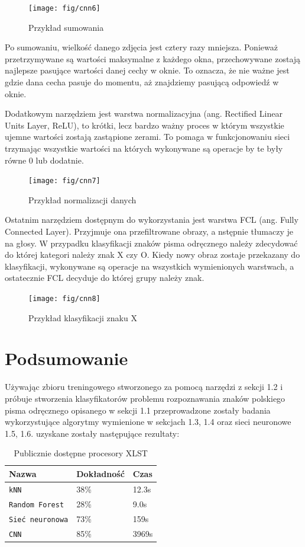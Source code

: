 \documentclass[brudnopis]{xmgr}
\begin{document}
\begin{figure}[!tbh]
\centering
\texttt{[image: fig/cnn6]}
\caption{Przykład sumowania}
\end{figure}

Po sumowaniu, wielkość danego zdjęcia jest cztery razy mniejsza. Ponieważ przetrzymywane są wartości maksymalne z każdego okna, przechowywane zostają najlepsze pasujące wartości danej cechy w oknie. To oznacza, że nie ważne jest gdzie dana cecha pasuje do momentu, aż znajdziemy pasującą odpowiedź w oknie.

Dodatkowym narzędziem jest warstwa normalizacyjna (ang. Rectified Linear Units Layer, ReLU), to krótki, lecz bardzo ważny proces w którym wszystkie ujemne wartości zostają zastąpione zerami. To pomaga w funkcjonowaniu sieci trzymając wszystkie wartości na których wykonywane są operacje by te były równe 0 lub dodatnie.

\begin{figure}[!tbh]
\centering
\texttt{[image: fig/cnn7]}
\caption{Przykład normalizacji danych}
\end{figure}
\newpage

Ostatnim narzędziem dostępnym do wykorzystania jest warstwa FCL (ang. Fully Connected Layer). Przyjmuje ona przefiltrowane obrazy, a nstępnie tłumaczy je na głosy. W przypadku klasyfikacji znaków pisma odręcznego należy zdecydować do której kategori należy znak X czy O. Kiedy nowy obraz zostaje przekazany do klasyfikacji, wykonywane są operacje na wszystkich wymienionych warstwach, a ostatecznie FCL decyduje do której grupy należy znak.

\begin{figure}[!tbh]
\centering
\texttt{[image: fig/cnn8]}
\caption{Przykład klasyfikacji znaku X}
\end{figure}
\newpage

\section{Podsumowanie}

Używając zbioru treningowego stworzonego za pomocą narzędzi z sekcji 1.2 i próbuje stworzenia klasyfikatorów problemu rozpoznawania znaków polskiego pisma odręcznego opisanego w sekcji 1.1 przeprowadzone zostały badania wykorzystujące algorytmy wymienione w sekcjach 1.3, 1.4 oraz sieci neuronowe 1.5, 1.6. uzyskane zostały następujące rezultaty:

\begin{table}[!htb]
\begin{tabular}{|l|l|l|} \hline
Nazwa & Dokładność      & Czas \\ \hline
\texttt{kNN} & 38\% & 12.3s \\ \hline
\texttt{Random Forest}        & 28\% & 9.0s \\ \hline
\texttt{Sieć neuronowa}     & 73\% & 159s \\ \hline
\texttt{CNN}     & 85\% &  3969s \\ \hline
\end{tabular}
\caption{Publicznie dostępne procesory XLST\label{zest:proces:xslt}}
\end{table}
\end{document}

